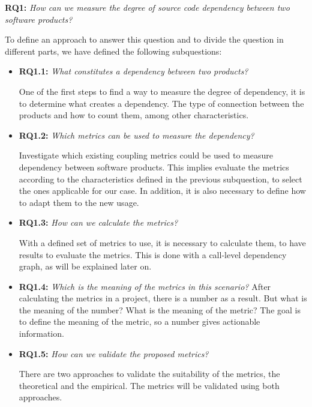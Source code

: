 \blankl
\textbf{RQ1:} \textit{How can we measure the degree of source code dependency between two software products?}

To define an approach to answer this question and to divide the question in different parts, we have defined the following subquestions:

\begin{itemize}
  \item \textbf{RQ1.1:} \textit{What constitutes a dependency between two products?}

  One of the first steps to find a way to measure the degree of dependency, it is to determine what creates a dependency. The type of connection between the products and how to count them, among other characteristics.

  \item \textbf{RQ1.2:} \textit{Which metrics can be used to measure the dependency?}

  Investigate which existing coupling metrics could be used to measure dependency between software products. This implies evaluate the metrics according to the characteristics defined in the previous subquestion, to select the ones applicable for our case. In addition, it is also necessary to define how to adapt them to the new usage.

  \item \textbf{RQ1.3:} \textit{How can we calculate the metrics?}

  With a defined set of metrics to use, it is necessary to calculate them, to have results to evaluate the metrics. This is done with a call-level dependency graph, as will be explained later on.

  \item \textbf{RQ1.4:} \textit{Which is the meaning of the metrics in this scenario?}
  After calculating the metrics in a project, there is a number as a result. But what is the meaning of the number? What is the meaning of the metric? The goal is to define the meaning of the metric, so a number gives actionable information.

  \item \textbf{RQ1.5:} \textit{How can we validate the proposed metrics?}

  There are two approaches to validate the suitability of the metrics, the theoretical  and the empirical. The metrics will be validated using both approaches.
\end{itemize}

